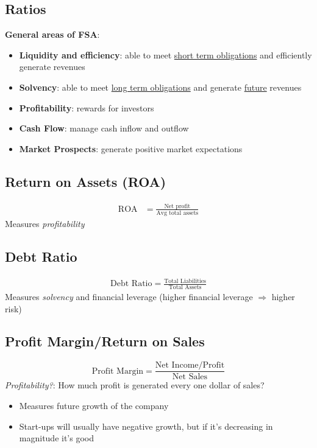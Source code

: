\documentclass{article}
\begin{document}
\begin{multicols}{2}
\section{Ratios}
\textbf{General areas of FSA}:
\begin{itemize}
	\item \textbf{Liquidity and efficiency}: able to meet \underline{short term obligations} and efficiently generate revenues
	\item \textbf{Solvency}: able to meet \underline{long term obligations} and generate \underline{future} revenues
	\item \textbf{Profitability}: rewards for investors
	\item \textbf{Cash Flow}: manage cash inflow and outflow
	\item \textbf{Market Prospects}: generate positive market expectations
\end{itemize}


\subsection{Return on Assets (ROA)}
\begin{equation*}
	\begin{aligned}
		\text{ROA} &= \frac{\text{Net profit}}{\text{Avg total assets}}
	\end{aligned}
\end{equation*}
Measures \textit{profitability}
\subsection{Debt Ratio}
\begin{equation*}
	\begin{aligned}
		\text{Debt Ratio} = \frac{\text{Total Liabilities}}{\text{Total Assets}}
	\end{aligned}
\end{equation*}
Measures \textit{solvency} and financial leverage (higher financial leverage $\Rightarrow$ higher risk)
\subsection{Profit Margin/Return on Sales}
$$\text{Profit Margin} = \frac{\text{Net Income/Profit}}{\text{Net Sales}}$$
\textit{Profitability?}: How much profit is generated every one dollar of sales?
\begin{itemize}
	\item Measures future growth of the company
	\item Start-ups will usually have negative growth, but if it's decreasing in magnitude it's good
\end{itemize}


\end{multicols}
\end{document}
